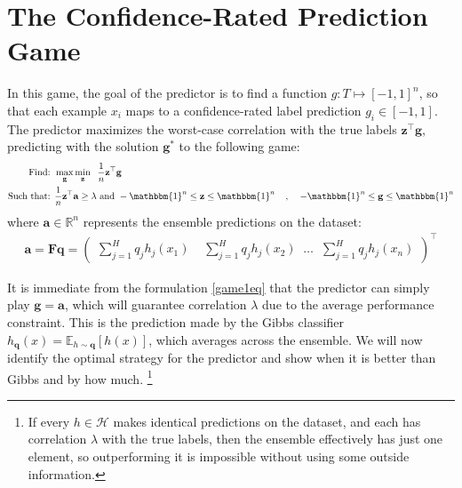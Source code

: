 \documentclass{article}[12pt]
\theoremstyle{named}
\newcommand{\ones}[1]{\mathbbm{1}^{#1}}
\newcommand{\va}{\mathbf{a}}
\newcommand{\vF}{\mathbf{F}}    %
\newcommand{\vg}{\mathbf{g}}    %
\newcommand{\vq}{\mathbf{q}}
\newcommand{\vz}{\mathbf{z}}
\newcommand{\RR}{\mathbb{R}}      %
\newcommand{\evp}[2]{\mathbb{E}_{#2} \left[#1\right]} %
\newcommand{\cH}{\mathcal{H}}
\begin{document}


\section{The Confidence-Rated Prediction Game}
\label{sec:game1}

In this game, the goal of the predictor is to find a function $g : T \mapsto [-1,1]^n$, 
so that each example $x_i$ maps to a confidence-rated label prediction $g_i \in [-1,1]$. 
The predictor maximizes the worst-case correlation with the true labels $\vz^\top \vg$, 
predicting with the solution $\vg^*$ to the following game:
\begin{eqnarray}
\label{game1eq}
\mbox{Find: }&\displaystyle \max_{\vg} \min_{\vz} \;\; \frac{1}{n} \vz^\top \vg \;\; \\
\mbox{Such that: }& \frac{1}{n} \vz^\top \va \geq \lambda \mbox{ and } -\ones{n} \leq \vz \leq \ones{n} 
\;\;\;\;,\;\;\;\; -\ones{n} \leq \vg \leq \ones{n} \notag
\end{eqnarray}
where $\va \in \RR^n$ represents the ensemble predictions on the dataset:
\begin{align*}
\va = \vF \vq
=
 \begin{pmatrix}
   \sum_{j=1}^H q_j h_j(x_1) \;\;\;\; \sum_{j=1}^H q_j h_j(x_2) \;\;\dots\;\; \sum_{j=1}^H q_j h_j(x_n)
 \end{pmatrix}^\top
\end{align*}


It is immediate from the formulation \eqref{game1eq} that the predictor can simply play $\vg = \va$, 
which will guarantee correlation $\lambda$ due to the average performance constraint.
This is the prediction made by the Gibbs classifier $h_\vq (x) = \evp{h(x)}{h \sim \vq}$, 
which averages across the ensemble. 
We will now identify the optimal strategy for the predictor and show
when it is better than Gibbs and by how much.
\footnote{\label{ftnote:identensemble}
If every $h \in \cH$ makes identical predictions on the dataset, 
and each has correlation $\lambda$ with the true labels, 
then the ensemble effectively has just one element, 
so outperforming it is impossible without using some outside information.}
\end{document}
